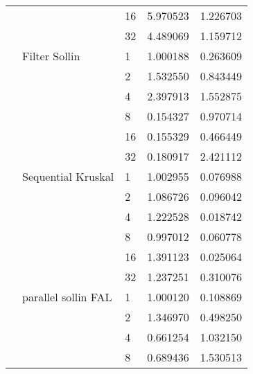 \begin{tabular}{lllrr}
                                                       &                     & 16 &  5.970523 &  1.226703 \\
                                                       &                     & 32 &  4.489069 &  1.159712 \\
                                                       & Filter Sollin & 1  &  1.000188 &  0.263609 \\
                                                       &                     & 2  &  1.532550 &  0.843449 \\
                                                       &                     & 4  &  2.397913 &  1.552875 \\
                                                       &                     & 8  &  0.154327 &  0.970714 \\
                                                       &                     & 16 &  0.155329 &  0.466449 \\
                                                       &                     & 32 &  0.180917 &  2.421112 \\
                                                       & Sequential Kruskal & 1  &  1.002955 &  0.076988 \\
                                                       &                     & 2  &  1.086726 &  0.096042 \\
                                                       &                     & 4  &  1.222528 &  0.018742 \\
                                                       &                     & 8  &  0.997012 &  0.060778 \\
                                                       &                     & 16 &  1.391123 &  0.025064 \\
                                                       &                     & 32 &  1.237251 &  0.310076 \\
                                                       & parallel sollin FAL & 1  &  1.000120 &  0.108869 \\
                                                       &                     & 2  &  1.346970 &  0.498250 \\
                                                       &                     & 4  &  0.661254 &  1.032150 \\
                                                       &                     & 8  &  0.689436 &  1.530513 \\

\end{tabular}
